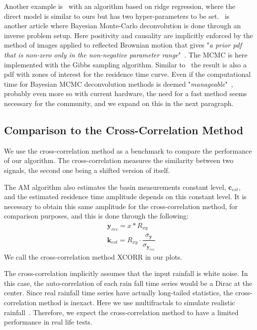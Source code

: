 \documentclass[]{elsarticle} %
\begin{document}
Another example is~\cite{Dietrich1993} with an algorithm based on ridge regression, where the direct model is similar to ours but has two hyper-parameters to be set.~\cite{Michalak2003} is another article where Bayesian Monte-Carlo deconvolution is done through an inverse problem setup. Here positivity and causality are implicitly enforced by the method of images applied to reflected Brownian motion that gives "\textit{a prior pdf that is non-zero only in the non-negative parameter range}"~\cite{Michalak2003}. The MCMC is here implemented with the Gibbs sampling algorithm. Similar to~\cite{Fienen2006} the result is also a pdf with zones of interest for the residence time curve. Even if the computational time for Bayesian MCMC deconvolution methods is deemed "\textit{manageable}"~\cite{Michalak2003}, probably even more so with current hardware, the need for a fast method seems necessary for the community, and we expand on this in the next paragraph. 


\subsection{Comparison to the Cross-Correlation Method}

We use the cross-correlation method as a benchmark to compare the performance of our algorithm. The cross-correlation measures the similarity between two signals, the second one being a shifted version of itself.

The AM algorithm also estimates the basin measurements constant level, $\textbf{c}_{est}$, and the estimated residence time amplitude depends on this constant level. It is necessary to obtain this same amplitude for the cross-correlation method, for comparison purposes, and this is done through the following:
\begin{equation}\label{12}
\begin{aligned}
&\textbf{y}_{rec} = x \ast R_{xy}\\
&\textbf{k}_{est} = R_{xy}\cdot \dfrac{\sigma_{\textbf{y}}}{\sigma_{\textbf{y}_{rec}}}
\end{aligned}
\end{equation}
We call the cross-correlation method XCORR in our plots.

The cross-correlation implicitly assumes that the input rainfall is white noise. In this case, the auto-correlation of each rain fall time series would be a Dirac at the center. Since real rainfall time series have actually long-tailed statistics, the cross-correlation method is inexact. Here we use multifractals to simulate realistic rainfall~\cite{Z_Hydro_Tessier1996b}. Therefore, we expect the cross-correlation method to have a limited performance in real life tests.
\end{document}
